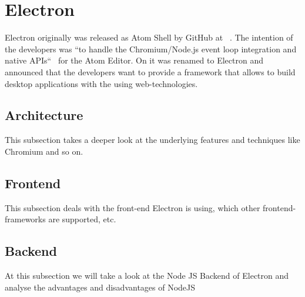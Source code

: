 \section{Electron}
\label{sec:electron}
Electron originally was released as Atom Shell by GitHub at ~\cite{githubReleaseV010}.
The intention of the developers was ``to handle the Chromium/Node.js event loop integration and native APIs``~\cite{sawicki_2015} for the Atom Editor.
On  it was renamed to Electron and announced that the developers want to provide a framework that allows to build desktop applications with the using web-technologies.

\subsection{Architecture}
\label{subsec:electron:arch}
This subsection takes a deeper look at the underlying features and techniques like Chromium and so on.
\subsection{Frontend}
\label{subsec:electron:frontend}
This subsection deals with the front-end Electron is using, which other frontend-frameworks are supported, etc.
\subsection{Backend}
\label{subsec:electron:backend}
At this subsection we will take a look at the Node JS Backend of Electron and analyse the advantages and disadvantages of NodeJS